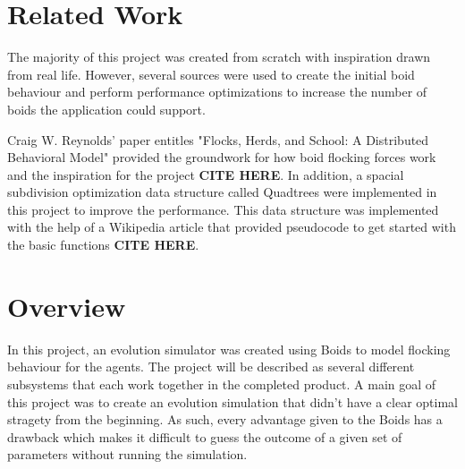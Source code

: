 \documentclass{egpubl}
\begin{document}
\section{Related Work}
The majority of this project was created from scratch with inspiration drawn from real life. However, several sources were used to create the initial boid behaviour and perform performance optimizations to increase the number of boids the application could support.
\par
Craig W. Reynolds' paper entitles "Flocks, Herds, and School: A Distributed Behavioral Model" provided the groundwork for how boid flocking forces work and the inspiration for the project \textbf{CITE HERE}. In addition, a spacial subdivision optimization data structure called Quadtrees were implemented in this project to improve the performance. This data structure was implemented with the help of a Wikipedia article that provided pseudocode to get started with the basic functions \textbf{CITE HERE}.
\section{Overview}
In this project, an evolution simulator was created using Boids to model flocking behaviour for the agents. The project will be described as several different subsystems that each work together in the completed product. A main goal of this project was to create an evolution simulation that didn't have a clear optimal stragety from the beginning. As such, every advantage given to the Boids has a drawback which makes it difficult to guess the outcome of a given set of parameters without running the simulation.
\end{document}
